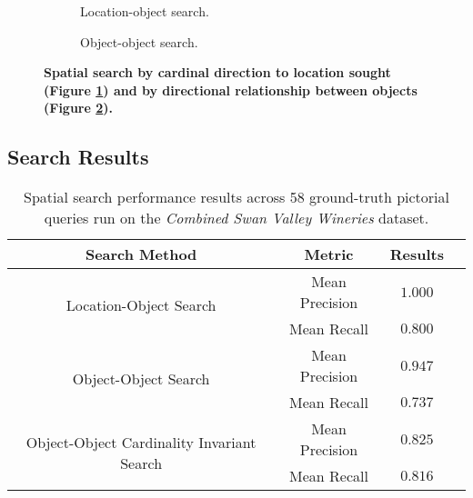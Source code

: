 \begin{figure}[h]
    \centering
    \begin{subfigure}[t]{.2\textwidth}
        
        \caption{\small Location-object search.} 
        \label{fig:spatial_search_loc}
    \end{subfigure}
    \hfill
    \begin{subfigure}[t]{.2\textwidth}
        
        \caption{\small Object-object search.} 
        \label{fig:spatial_search_obj}
    \end{subfigure}
    \hfill
    \caption{\textbf{Spatial search by cardinal direction to location sought (Figure \ref{fig:spatial_search_loc}) and by directional relationship between objects (Figure \ref{fig:spatial_search_obj}).}}\label{figure:spatial_search} 
\end{figure}
\normalsize


\subsection{Search Results}

\small{
\begin{table}[h!]
    \begin{center}
        \begin{tabular}{ |c|c|c|c| } 
            \hline
            Search Method & Metric & Results \\
            \hline
            \multirow{2}{18em}{Location-Object Search} & Mean Precision & $1.000$ \\
            & Mean Recall & $0.800$\\%
            \hline     
            \multirow{2}{18em}{Object-Object Search} & Mean Precision & $0.947$ \\ 
            &Mean Recall & $0.737$ \\
            \hline
            \multirow{2}{18em}{Object-Object Cardinality Invariant Search} & Mean Precision & $0.825$ \\ 
            &Mean Recall & $0.816$ \\
            \hline
        \end{tabular}
        \caption{Spatial search performance results across 58 ground-truth pictorial queries run on the \textit{Combined Swan Valley Wineries} dataset.} %
        \label{Table:GroundTruth}
    \end{center}
    \vspace{-20pt}
\end{table}
}
\normalsize
